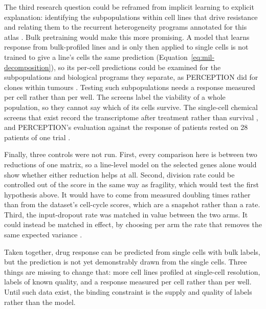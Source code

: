 The third research question could be reframed from implicit
learning to explicit explanation: identifying the subpopulations within cell lines that drive resistance
and relating them to the recurrent heterogeneity programs annotated for this atlas \cite{scp542}.
Bulk pretraining would make this more promising. A model that learns response from bulk-profiled lines
and is only then applied to single cells is not trained to give a line's cells the same prediction
(Equation~\ref{eq:mil-decomposition}), so its per-cell predictions could be examined for the
subpopulations and biological programs they separate, as PERCEPTION did for clones within tumours
\cite{perception}.
Testing such subpopulations needs a response measured per cell rather than per well. The screens label
the viability of a whole population, so they cannot say which of its cells survive. The single-cell
chemical screens that exist record the transcriptome after treatment rather than survival
\cite{srivatsan2020,tahoe100m}, and PERCEPTION's evaluation against the response of patients rested on
28 patients of one trial \cite{perception}.

Finally, three controls were not run. First, every comparison here is between two
reductions of one matrix, so a line-level model on the \NHvg{} selected genes alone would show whether
either reduction helps at all. Second, division rate could be controlled out of the score in the same
way as fragility, which would test the first hypothesis above. It would have to come from measured
doubling times rather than from the dataset's cell-cycle scores, which are a snapshot rather than a
rate. Third, the input-dropout rate was matched in value between the two arms. It could instead be
matched in effect, by choosing per arm the rate that removes the same expected variance
\cite{srivastava2014}.

Taken together, drug response can be predicted from single cells with bulk labels, but the prediction
is not yet demonstrably drawn from the single cells. Three things are missing to change that: more
cell lines profiled at single-cell resolution, labels of known quality, and a response measured per
cell rather than per well. Until such data exist, the binding constraint is the supply and quality of
labels rather than the model.
